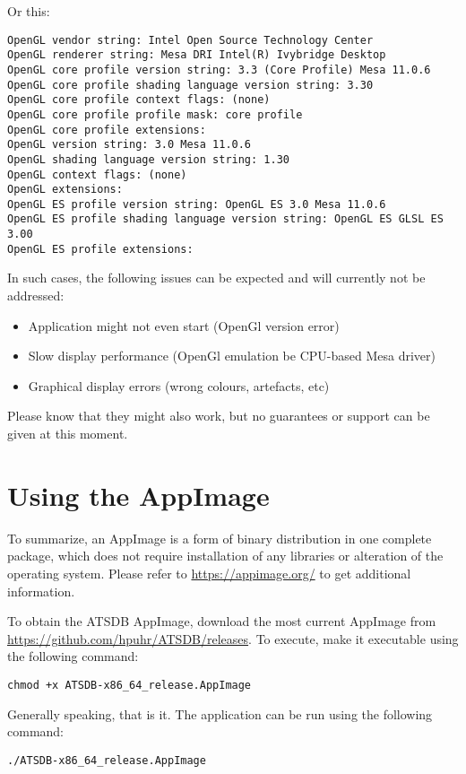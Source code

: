 Or this:

\begin{verbatim}
OpenGL vendor string: Intel Open Source Technology Center
OpenGL renderer string: Mesa DRI Intel(R) Ivybridge Desktop 
OpenGL core profile version string: 3.3 (Core Profile) Mesa 11.0.6
OpenGL core profile shading language version string: 3.30
OpenGL core profile context flags: (none)
OpenGL core profile profile mask: core profile
OpenGL core profile extensions:
OpenGL version string: 3.0 Mesa 11.0.6
OpenGL shading language version string: 1.30
OpenGL context flags: (none)
OpenGL extensions:
OpenGL ES profile version string: OpenGL ES 3.0 Mesa 11.0.6
OpenGL ES profile shading language version string: OpenGL ES GLSL ES 3.00
OpenGL ES profile extensions:
\end{verbatim}

In such cases, the following issues can be expected and will currently not be addressed:

\begin{itemize} 
\item Application might not even start (OpenGl version error)
\item Slow display performance (OpenGl emulation be CPU-based Mesa driver)
\item Graphical display errors (wrong colours, artefacts, etc) 
\end{itemize} 

Please know that they might also work, but no guarantees or support can be given at this moment.

\section{Using the AppImage}

To summarize, an AppImage is a form of binary distribution in one complete package, which does not require installation of any libraries or alteration of the operating system. Please refer to \url{https://appimage.org/} to get additional information.

To obtain the ATSDB AppImage, download the most current AppImage from \url{https://github.com/hpuhr/ATSDB/releases}. To execute, make it executable using the following command:
\begin{verbatim}
chmod +x ATSDB-x86_64_release.AppImage
\end{verbatim}

Generally speaking, that is it. The application can be run using the following command:
\begin{verbatim}
./ATSDB-x86_64_release.AppImage
\end{verbatim}

